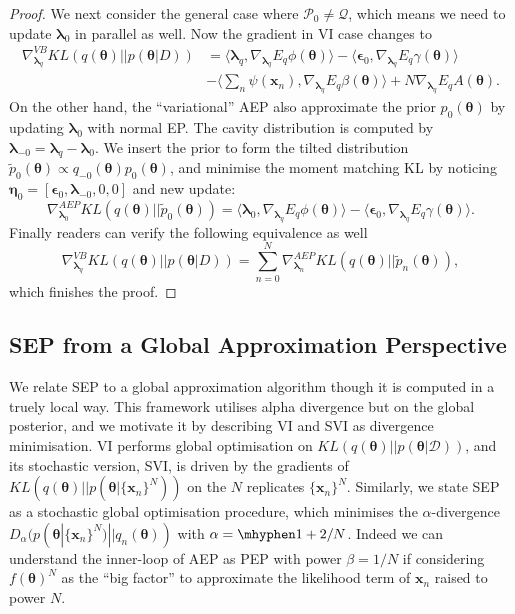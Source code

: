 \documentclass{article} %
\begin{document}
\begin{proof}
We next consider the general case where $\mathcal{P}_0 \neq \mathcal{Q}$, which means we need to update $\bm{\lambda}_0$ in parallel as well. Now the gradient in VI case changes to
\begin{equation}
\begin{aligned}
\nabla_{\bm{\lambda}_q}^{VB} KL(q(\bm{\theta}) || p(\bm{\theta} | D)) &= \langle \bm{\lambda}_q, \nabla_{\bm{\lambda}_q} E_q \phi(\bm{\theta}) \rangle - \langle \bm{\epsilon}_0, \nabla_{\bm{\lambda}_q} E_q \gamma(\bm{\theta}) \rangle \\
	&- \langle \sum_{n} \psi(\bm{x}_n), \nabla_{\bm{\lambda}_q} E_q \beta(\bm{\theta}) \rangle + N \nabla_{\bm{\lambda}_q} E_q A(\bm{\theta}).
\end{aligned}
\end{equation}
On the other hand, the ``variational'' AEP also approximate the prior $p_0(\bm{\theta})$ by updating $\bm{\lambda}_0$ with normal EP. The cavity distribution is computed by $\bm{\lambda}_{-0} = \bm{\lambda}_q - \bm{\lambda}_0$. We insert the prior to form the tilted distribution $\tilde{p}_0(\bm{\theta}) \propto q_{-0}(\bm{\theta}) p_0(\bm{\theta})$, and minimise the moment matching KL by noticing $\bm{\eta}_0 = [\bm{\epsilon}_0, \bm{\lambda}_{-0}, 0, 0]$ and new update:
\begin{equation}
\nabla_{\bm{\lambda}_0}^{AEP} KL(q(\bm{\theta}) || \tilde{p}_0(\bm{\theta})) = \langle \bm{\lambda}_0, \nabla_{\bm{\lambda}_q} E_q \phi(\bm{\theta}) \rangle - \langle \bm{\epsilon}_0, \nabla_{\bm{\lambda}_q} E_q \gamma(\bm{\theta}) \rangle.
\end{equation}
Finally readers can verify the following equivalence as well
\begin{equation}
\nabla_{\bm{\lambda}_q}^{VB} KL(q(\bm{\theta}) || p(\bm{\theta} | D)) = \sum_{n=0}^N \nabla_{\bm{\lambda}_n}^{AEP} KL(q(\bm{\theta}) || \tilde{p}_n(\bm{\theta})),
\end{equation}
which finishes the proof.
\end{proof}

%
\subsection{SEP from a Global Approximation Perspective}
We relate SEP to a global approximation algorithm though it is computed in a truely local way. This framework utilises alpha divergence but on the global posterior, and we motivate it by describing VI and SVI as divergence minimisation.
%
VI performs global optimisation on $KL(q(\bm{\theta})||p(\bm{\theta}|\mathcal{D}))$, and its stochastic version, SVI, is driven by the gradients of $KL(q(\bm{\theta}) || p(\bm{\theta} | \{\bm{x}_n\}^N))$ on the $N$ replicates $\{\bm{x}_n\}^N$. Similarly, we state SEP as a stochastic global optimisation procedure, which minimises the $\alpha$-divergence $D_{\alpha}(p(\bm{\theta} | \{\bm{x}_n\}^N) || q_n(\bm{\theta}))$ with $\alpha = \mhyphen 1 + 2/N$. Indeed we can understand the inner-loop of AEP as PEP with power $\beta = 1/N$ if considering $f(\bm{\theta})^N$ as the ``big factor'' to approximate the likelihood term of $\bm{x}_n$ raised to power $N$.
\end{document}
